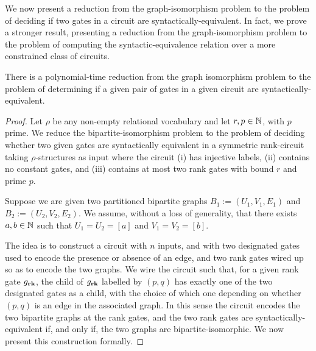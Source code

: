 \documentclass[../main/thesis.tex]{subfiles}
\begin{document}
We now present a reduction from the graph-isomorphism problem to the problem of
deciding if two gates in a circuit are syntactically-equivalent. In fact, we
prove a stronger result, presenting a reduction from the graph-isomorphism
problem to the problem of computing the syntactic-equivalence relation over a
more constrained class of circuits.

\begin{prop}
  There is a polynomial-time reduction from the graph isomorphism problem to the
  problem of determining if a given pair of gates in a given circuit are
  syntactically-equivalent.
  \label{prop:syntactic-graph-iso}
\end{prop}
\begin{proof}
  Let $\rho$ be any non-empty relational vocabulary and let $r, p \in \mathbb{N}$,
  with $p$ prime. We reduce the bipartite-isomorphism problem to the problem of
  deciding whether two given gates are syntactically equivalent in a symmetric
  rank-circuit taking $\rho$-structures as input where the circuit (i) has
  injective labels, (ii) contains no constant gates, and (iii) contains at most
  two rank gates with bound $r$ and prime $p$.

  Suppose we are given two partitioned bipartite graphs $B_1 := (U_1, V_1, E_1)$
  and $B_2 := (U_2, V_2, E_2)$. We assume, without a loss of generality, that
  there exists $a, b \in \mathbb{N}$ such that $U_1 = U_2 = [a]$ and $V_1 = V_2 =
  [b]$.

  The idea is to construct a circuit with $n$ inputs, and with two designated
  gates used to encode the presence or absence of an edge, and two rank gates
  wired up so as to encode the two graphs. We wire the circuit such that, for a
  given rank gate $g_{\text{\textbf{rk}}}$, the child of $g_{\text{\textbf{rk}}}$ labelled by $(p,q)$ has
  exactly one of the two designated gates as a child, with the choice of which
  one depending on whether $(p,q)$ is an edge in the associated graph. In this
  sense the circuit encodes the two bipartite graphs at the rank gates, and the
  two rank gates are syntactically-equivalent if, and only if, the two graphs
  are bipartite-isomorphic. We now present this construction formally.


\end{proof}
\end{document}
